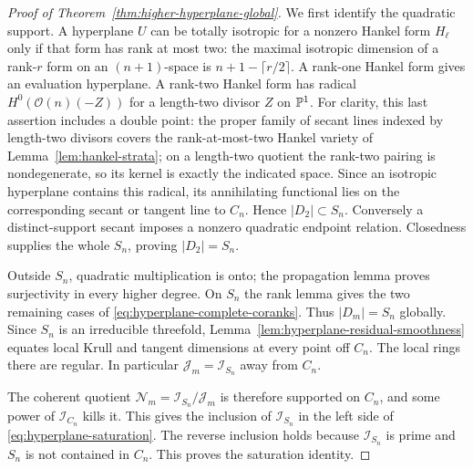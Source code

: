 \begin{proof}[Proof of Theorem~\ref{thm:higher-hyperplane-global}]
We first identify the quadratic support. A hyperplane $U$ can be
totally isotropic for a nonzero Hankel form $H_\ell$ only if that
form has rank at most two: the maximal isotropic dimension of a
rank-$r$ form on an $(n+1)$-space is
$n+1-\lceil r/2\rceil$. A rank-one Hankel form gives an evaluation
hyperplane. A rank-two Hankel form has radical
$H^0(\mathcal O(n)(-Z))$ for a length-two divisor $Z$ on $\mathbb P^1$.
For clarity, this last assertion includes a double point: the proper
family of secant lines indexed by length-two divisors covers the
rank-at-most-two Hankel variety of Lemma~\ref{lem:hankel-strata};
on a length-two quotient the rank-two pairing is nondegenerate,
so its kernel is exactly the indicated space. Since an isotropic
hyperplane contains this radical, its annihilating functional lies
on the corresponding secant or tangent line to $C_n$. Hence
$|D_2|\subset S_n$. Conversely a distinct-support secant imposes a
nonzero quadratic endpoint relation. Closedness supplies the whole
$S_n$, proving $|D_2|=S_n$.

Outside $S_n$, quadratic multiplication is onto; the propagation
lemma proves surjectivity in every higher degree. On $S_n$ the rank
lemma gives the two remaining cases of
\eqref{eq:hyperplane-complete-coranks}. Thus $|D_m|=S_n$ globally.
Since $S_n$ is an irreducible threefold,
Lemma~\ref{lem:hyperplane-residual-smoothness} equates local Krull
and tangent dimensions at every point off $C_n$. The local rings
there are regular. In particular
$\mathcal J_m=\mathcal I_{S_n}$ away from $C_n$.

The coherent quotient
$\mathcal N_m=\mathcal I_{S_n}/\mathcal J_m$ is therefore
supported on $C_n$, and some power of $\mathcal I_{C_n}$ kills it.
This gives the inclusion of $\mathcal I_{S_n}$ in the left side
of \eqref{eq:hyperplane-saturation}. The reverse inclusion holds
because $\mathcal I_{S_n}$ is prime and $S_n$ is not contained in
$C_n$. This proves the saturation identity.


\end{proof}
